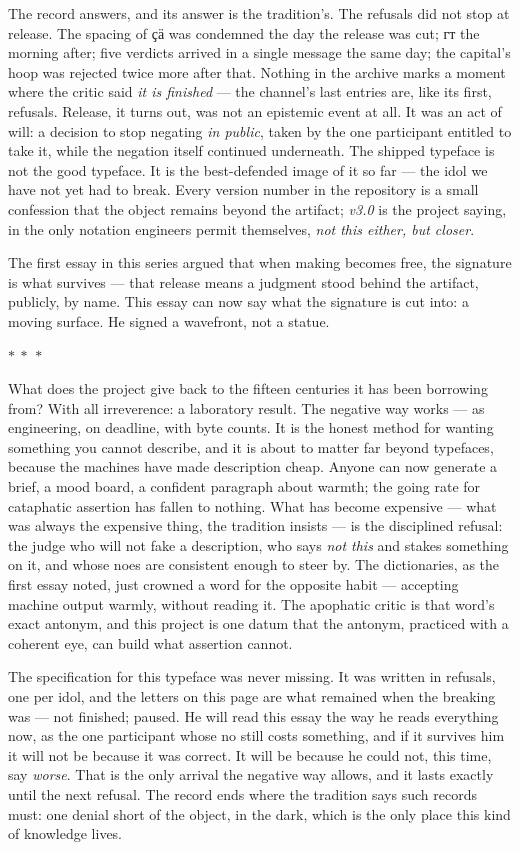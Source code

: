 \documentclass[11pt]{article}
\newcommand{\cz}[1]{{\chu #1}}
\newcommand{\separator}{\begin{center}\vspace{2pt}$\ast\ \ast\ \ast$\vspace{2pt}\end{center}}
\begin{document}
The record answers, and its answer is the tradition's. The refusals did not stop at release. The spacing of \cz{ҫӓ} was condemned the day the release was cut; \cz{гт} the morning after; five verdicts arrived in a single message the same day; the capital's hoop was rejected twice more after that. Nothing in the archive marks a moment where the critic said \emph{it is finished} — the channel's last entries are, like its first, refusals. Release, it turns out, was not an epistemic event at all. It was an act of will: a decision to stop negating \emph{in public}, taken by the one participant entitled to take it, while the negation itself continued underneath. The shipped typeface is not the good typeface. It is the best-defended image of it so far — the idol we have not yet had to break. Every version number in the repository is a small confession that the object remains beyond the artifact; \emph{v3.0} is the project saying, in the only notation engineers permit themselves, \emph{not this either, but closer}.

The first essay in this series argued that when making becomes free, the signature is what survives — that release means a judgment stood behind the artifact, publicly, by name. This essay can now say what the signature is cut into: a moving surface. He signed a wavefront, not a statue.

\separator

What does the project give back to the fifteen centuries it has been borrowing from? With all irreverence: a laboratory result. The negative way works — as engineering, on deadline, with byte counts. It is the honest method for wanting something you cannot describe, and it is about to matter far beyond typefaces, because the machines have made description cheap. Anyone can now generate a brief, a mood board, a confident paragraph about warmth; the going rate for cataphatic assertion has fallen to nothing. What has become expensive — what was always the expensive thing, the tradition insists — is the disciplined refusal: the judge who will not fake a description, who says \emph{not this} and stakes something on it, and whose noes are consistent enough to steer by. The dictionaries, as the first essay noted, just crowned a word for the opposite habit — accepting machine output warmly, without reading it. The apophatic critic is that word's exact antonym, and this project is one datum that the antonym, practiced with a coherent eye, can build what assertion cannot.

The specification for this typeface was never missing. It was written in refusals, one per idol, and the letters on this page are what remained when the breaking was — not finished; paused. He will read this essay the way he reads everything now, as the one participant whose no still costs something, and if it survives him it will not be because it was correct. It will be because he could not, this time, say \emph{worse}. That is the only arrival the negative way allows, and it lasts exactly until the next refusal. The record ends where the tradition says such records must: one denial short of the object, in the dark, which is the only place this kind of knowledge lives.
\end{document}
